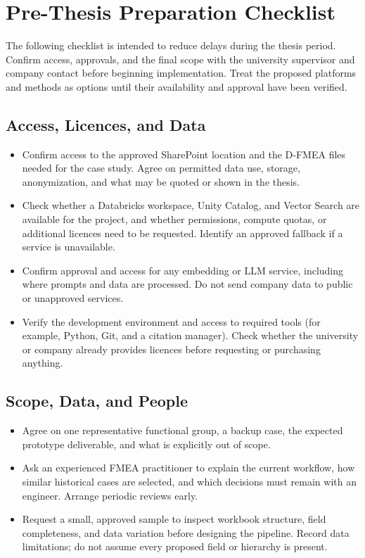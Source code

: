 
\clearpage
\section{Pre-Thesis Preparation Checklist}

The following checklist is intended to reduce delays during the thesis period. Confirm
access, approvals, and the final scope with the university supervisor and company
contact before beginning implementation. Treat the proposed platforms and methods as
options until their availability and approval have been verified.

\subsection*{Access, Licences, and Data}
\begin{itemize}[nosep, leftmargin=*]
    \item Confirm access to the approved SharePoint location and the D-FMEA files needed
    for the case study. Agree on permitted data use, storage, anonymization, and what
    may be quoted or shown in the thesis.
    \item Check whether a Databricks workspace, Unity Catalog, and Vector Search are
    available for the project, and whether permissions, compute quotas, or additional
    licences need to be requested. Identify an approved fallback if a service is
    unavailable.
    \item Confirm approval and access for any embedding or LLM service, including where
    prompts and data are processed. Do not send company data to public or unapproved
    services.
    \item Verify the development environment and access to required tools (for example,
    Python, Git, and a citation manager). Check whether the university or company
    already provides licences before requesting or purchasing anything.
\end{itemize}

\subsection*{Scope, Data, and People}
\begin{itemize}[nosep, leftmargin=*]
    \item Agree on one representative functional group, a backup case, the expected
    prototype deliverable, and what is explicitly out of scope.
    \item Ask an experienced FMEA practitioner to explain the current workflow, how
    similar historical cases are selected, and which decisions must remain with an
    engineer. Arrange periodic reviews early.
    \item Request a small, approved sample to inspect workbook structure, field
    completeness, and data variation before designing the pipeline. Record data
    limitations; do not assume every proposed field or hierarchy is present.
\end{itemize}

